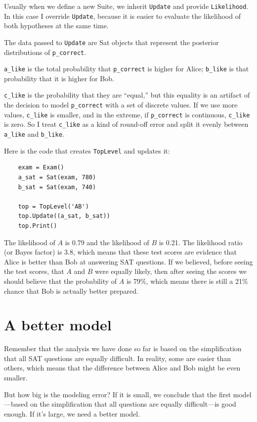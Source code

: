 \documentclass[12pt]{book}
\begin{document}
Usually when we define a new Suite, we inherit {\tt Update}
and provide {\tt Likelihood}.  In this case I override {\tt Update},
because it is easier to evaluate the likelihood of both
hypotheses at the same time.

The data passed to {\tt Update} are Sat objects that represent
the posterior distributions of \verb"p_correct".

\verb"a_like" is the total probability that
\verb"p_correct" is higher for Alice; \verb"b_like" is that
probability that it is higher for Bob.

\verb"c_like" is the probability that they are ``equal,'' but this
equality is an artifact of the decision to model \verb"p_correct" with
a set of discrete values.  If we use more values, \verb"c_like"
is smaller, and in the extreme, if \verb"p_correct" is
continuous, \verb"c_like" is zero.  So I treat \verb"c_like" as
a kind of round-off error and split it evenly between \verb"a_like"
and \verb"b_like".

Here is the code that creates {\tt TopLevel} and updates it:

\begin{verbatim}
    exam = Exam()
    a_sat = Sat(exam, 780)
    b_sat = Sat(exam, 740)

    top = TopLevel('AB')
    top.Update((a_sat, b_sat))
    top.Print()
\end{verbatim}

The likelihood of $A$ is 0.79 and the likelihood of $B$ is 0.21.  The
likelihood ratio (or Bayes factor) is 3.8, which means that these test
scores are evidence that Alice is better than Bob at answering SAT
questions.  If we believed, before seeing the test scores, that $A$
and $B$ were equally likely, then after seeing the scores we should
believe that the probability of $A$ is 79\%, which means there is
still a 21\% chance that Bob is actually better prepared.


\section{A better model}

Remember that the analysis we have done so far is based on
the simplification that all SAT questions are equally difficult.
In reality, some are easier than others, which means that the
difference between Alice and Bob might be even smaller.

But how big is the modeling error?  If it is small, we conclude
that the first model---based on the simplification that all questions
are equally difficult---is good enough.  If it's large,
we need a better model.
\end{document}
